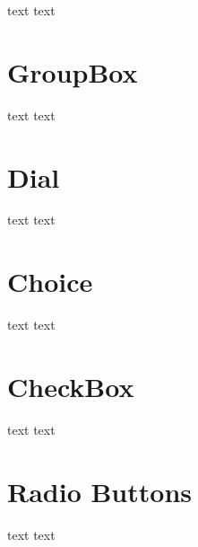 text text\par
 \hypertarget{d0/d90/intro_widgets_groupBox}{}\section{Group\-Box}\label{d0/d90/intro_widgets_groupBox}
text text\par
 \hypertarget{d0/d90/intro_widgets_dial}{}\section{Dial}\label{d0/d90/intro_widgets_dial}
text text\par
 \hypertarget{d0/d90/intro_widgets_choice}{}\section{Choice}\label{d0/d90/intro_widgets_choice}
text text\par
 \hypertarget{d0/d90/intro_widgets_checkBox}{}\section{Check\-Box}\label{d0/d90/intro_widgets_checkBox}
text text\par
 \hypertarget{d0/d90/intro_widgets_radioButtons}{}\section{Radio Buttons}\label{d0/d90/intro_widgets_radioButtons}
text text\par
 